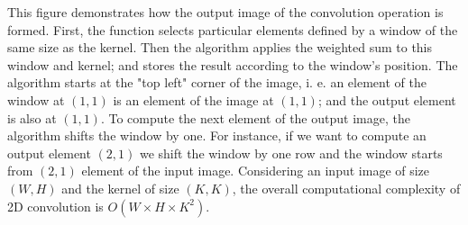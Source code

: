 
This figure demonstrates how the output image of the convolution operation is formed. 
First, the function selects particular elements defined by a window of the same size as the kernel.
Then the algorithm applies the weighted sum to this window and kernel;
and stores the result according to the window's position. 
The algorithm starts at the "top left" corner of the image, 
i. e. an element of the window at $(1, 1)$ is an element of the image at $(1, 1)$; 
and the output element is also at $(1, 1)$.
To compute the next element of the output image, the algorithm shifts the window by one.
For instance, if we want to compute an output element $(2, 1)$ we shift the window by one row and 
the window starts from 
$(2, 1)$ element of the input image.
Considering an input image of size $(W, H)$ and the kernel of size $(K, K)$, 
the overall computational complexity of 2D convolution is $O(W \times H \times K^2)$.

